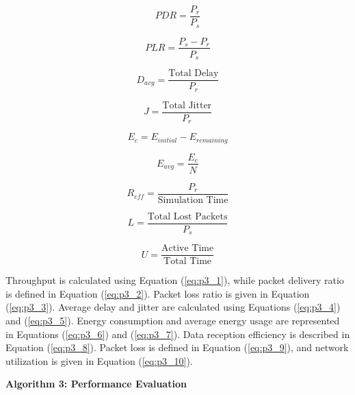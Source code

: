 \documentclass[a4paper,fleqn]{cas-dc}
\numberwithin{equation}{section}
\begin{document}
\begin{equation}
PDR = \frac{P_r}{P_s}
\label{eq:p3_2}
\end{equation}

\begin{equation}
PLR = \frac{P_s - P_r}{P_s}
\label{eq:p3_3}
\end{equation}

\begin{equation}
D_{avg} = \frac{\text{Total Delay}}{P_r}
\label{eq:p3_4}
\end{equation}

\begin{equation}
J = \frac{\text{Total Jitter}}{P_r}
\label{eq:p3_5}
\end{equation}

\begin{equation}
E_c = E_{initial} - E_{remaining}
\label{eq:p3_6}
\end{equation}

\begin{equation}
E_{avg} = \frac{E_c}{N}
\label{eq:p3_7}
\end{equation}

\begin{equation}
R_{eff} = \frac{P_r}{\text{Simulation Time}}
\label{eq:p3_8}
\end{equation}

\begin{equation}
L = \frac{\text{Total Lost Packets}}{P_s}
\label{eq:p3_9}
\end{equation}

\begin{equation}
U = \frac{\text{Active Time}}{\text{Total Time}}
\label{eq:p3_10}
\end{equation}

Throughput is calculated using Equation (\ref{eq:p3_1}), while packet delivery ratio is defined in Equation (\ref{eq:p3_2}). Packet loss ratio is given in Equation (\ref{eq:p3_3}). Average delay and jitter are calculated using Equations (\ref{eq:p3_4}) and (\ref{eq:p3_5}). Energy consumption and average energy usage are represented in Equations (\ref{eq:p3_6}) and (\ref{eq:p3_7}). Data reception efficiency is described in Equation (\ref{eq:p3_8}). Packet loss is defined in Equation (\ref{eq:p3_9}), and network utilization is given in Equation (\ref{eq:p3_10}).
\clearpage

\noindent\textbf{Algorithm 3:  Performance Evaluation}
\label{alg:phase3}
\end{document}
